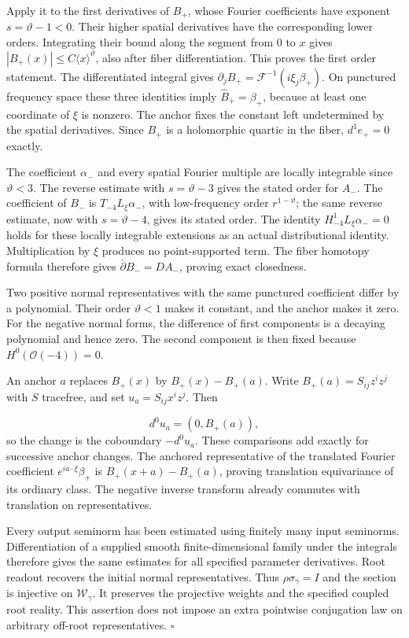 \documentclass[
  english,
  11pt,
  reqno]{amsart}
\begin{document}
Apply it to the first derivatives of \(B_+\), whose Fourier coefficients
have exponent \(s=\vartheta-1<0\). Their higher spatial derivatives have
the corresponding lower orders. Integrating their bound along the
segment from \(0\) to \(x\) gives
\(|B_+(x)|\le C\langle x\rangle^{\vartheta}\), also after fiber
differentiation. This proves the first order statement. The
differentiated integral gives
\(\partial_jB_+=\mathcal F^{-1}(i\xi_j\beta_+)\). On punctured frequency
space these three identities imply \(\widehat B_+=\beta_+\), because at
least one coordinate of \(\xi\) is nonzero. The anchor fixes the
constant left undetermined by the spatial derivatives. Since \(B_+\) is
a holomorphic quartic in the fiber, \(d^1e_+=0\) exactly.

The coefficient \(\alpha_-\) and every spatial Fourier multiple are
locally integrable since \(\vartheta<3\). The reverse estimate with
\(s=\vartheta-3\) gives the stated order for \(A_-\). The coefficient of
\(B_-\) is \(T_{-4}L_\xi\alpha_-\), with low-frequency order
\(r^{1-\vartheta}\); the same reverse estimate, now with
\(s=\vartheta-4\), gives its stated order. The identity
\(H_{-4}^1L_\xi\alpha_-=0\) holds for these locally integrable
extensions as an actual distributional identity. Multiplication by
\(\xi\) produces no point-supported term. The fiber homotopy formula
therefore gives \(\bar\partial B_-=D A_-\), proving exact closedness.

Two positive normal representatives with the same punctured coefficient
differ by a polynomial. Their order \(\vartheta<1\) makes it constant,
and the anchor makes it zero. For the negative normal forms, the
difference of first components is a decaying polynomial and hence zero.
The second component is then fixed because \(H^0(\mathcal O(-4))=0\).

An anchor \(a\) replaces \(B_+(x)\) by \(B_+(x)-B_+(a)\). Write
\(B_+(a)=S_{ij}z^iz^j\) with \(S\) tracefree, and set
\(u_a=S_{ij}x^iz^j\). Then

\label{eq:online-positive-anchor-coboundary} \[
d^0u_a=(0,B_+(a)),
\] so the change is the coboundary \(-d^0u_a\). These comparisons add
exactly for successive anchor changes. The anchored representative of
the translated Fourier coefficient \(e^{ia\cdot\xi}\beta_+\) is
\(B_+(x+a)-B_+(a)\), proving translation equivariance of its ordinary
class. The negative inverse transform already commutes with translation
on representatives.

Every output seminorm has been estimated using finitely many input
seminorms. Differentiation of a supplied smooth finite-dimensional
family under the integrals therefore gives the same estimates for all
specified parameter derivatives. Root readout recovers the initial
normal representatives. Thus \(\rho\sigma_\gamma=I\) and the section is
injective on \(\mathscr W_\gamma\). It preserves the projective weights
and the specified coupled root reality. This assertion does not impose
an extra pointwise conjugation law on arbitrary off-root
representatives. \hfill\(\square\)
\end{document}
